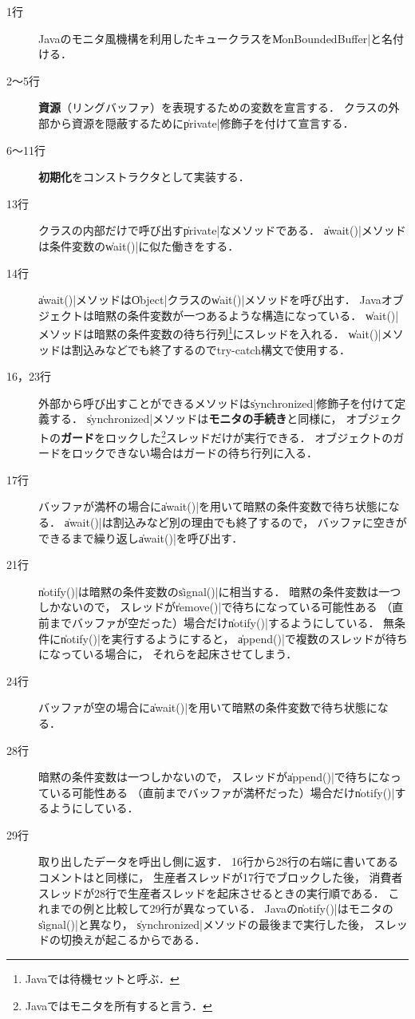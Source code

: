 \begin{description}
\item [1行]
Javaのモニタ風機構を利用したキュークラスを\|MonBoundedBuffer|と名付ける．

\item [2〜5行]
{\bf 資源}（リングバッファ）を表現するための変数を宣言する．
クラスの外部から資源を隠蔽するために\|private|修飾子を付けて宣言する．

\item [6〜11行]
{\bf 初期化}をコンストラクタとして実装する．

\item [13行]
クラスの内部だけで呼び出す\|private|なメソッドである．
\|await()|メソッドは条件変数の\|wait()|に似た働きをする．

\item [14行]
\|await()|メソッドは\|Object|クラスの\|wait()|メソッドを呼び出す．
Javaオブジェクトは暗黙の条件変数が一つあるような構造になっている．
\|wait()|メソッドは暗黙の条件変数の待ち行列\footnote{
Javaでは待機セットと呼ぶ．}にスレッドを入れる．
\|wait()|メソッドは割込みなどでも終了するのでtry-catch構文で使用する．

\item [16，23行]
外部から呼び出すことができるメソッドは\|synchronized|修飾子を付けて定義する．
\|synchronized|メソッドは{\bf モニタの手続き}と同様に，
オブジェクトの{\bf ガード}をロックした\footnote{
Javaではモニタを所有すると言う．}スレッドだけが実行できる．
オブジェクトのガードをロックできない場合はガードの待ち行列に入る．

\item [17行]
バッファが満杯の場合に\|await()|を用いて暗黙の条件変数で待ち状態になる．
\|await()|は割込みなど別の理由でも終了するので，
バッファに空きができるまで繰り返し\|await()|を呼び出す．

\item [21行]
\|notify()|は暗黙の条件変数の\|signal()|に相当する．
暗黙の条件変数は一つしかないので，
スレッドが\|remove()|で待ちになっている可能性ある
（直前までバッファが空だった）場合だけ\|notify()|するようにしている．
無条件に\|notify()|を実行するようにすると，
\|append()|で複数のスレッドが待ちになっている場合に，
それらを起床させてしまう．

\item [24行]
バッファが空の場合に\|await()|を用いて暗黙の条件変数で待ち状態になる．

\item [28行]
暗黙の条件変数は一つしかないので，
スレッドが\|append()|で待ちになっている可能性ある
（直前までバッファが満杯だった）場合だけ\|notify()|するようにしている．

\item [29行]
取り出したデータを呼出し側に返す．
16行から28行の右端に書いてあるコメントはと同様に，
生産者スレッドが17行でブロックした後，
消費者スレッドが28行で生産者スレッドを起床させるときの実行順である．
これまでの例と比較して29行が異なっている．
Javaの\|notify()|はモニタの\|signal()|と異なり，
\|synchronized|メソッドの最後まで実行した後，
スレッドの切換えが起こるからである．
\end{description}

